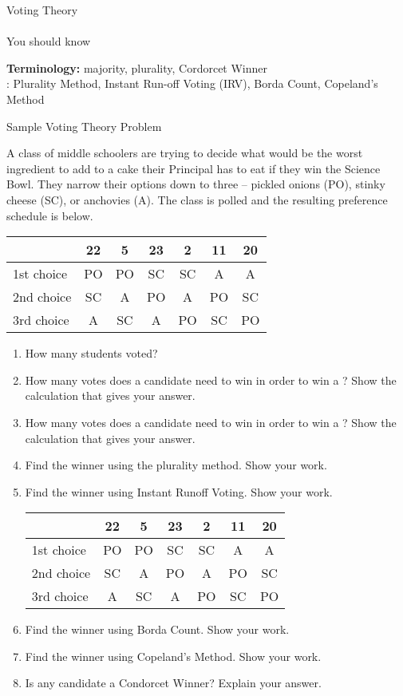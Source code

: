 \documentclass[12pt]{article}
\begin{document}
\begin{center} {\Large{Voting Theory}} \\ \quad \\You should know \end{center}

\noindent\textbf{Terminology:} majority, plurality, Cordorcet Winner\\

: Plurality Method, Instant Run-off Voting (IRV), Borda Count, Copeland's Method

\begin{center} {\Large{Sample Voting Theory Problem}}  \end{center}



A class of middle schoolers are trying to decide what would be the worst ingredient to add to a cake their Principal has to eat if they win the Science Bowl. They narrow their options down to three  -- pickled onions (PO), stinky cheese (SC), or anchovies (A). The class is polled and the resulting preference schedule is below.	\\

\begin{center}
\begin{tabular}{l || c|c|c|c|c|c}
&22&5&23&2&11&20\\
\hline \hline
1st choice& PO&PO&SC&SC&A&A\\
\hline
2nd choice&SC&A&PO&A&PO&SC\\
\hline
3rd choice&A&SC&A&PO&SC&PO
\end{tabular}
\end{center}
\begin{enumerate}
	\item How many students voted?
	\item How many votes does a candidate need to win in order to win a ? Show the calculation that gives your answer.
	\item How many votes does a candidate need to win in order to win a ? Show the calculation that gives your answer.
	\item Find the winner using the plurality method. Show your work.
	\vfill
	\item Find the winner using Instant Runoff Voting.  Show your work.
	\vfill
	\newpage
	\begin{center}
\begin{tabular}{l || c|c|c|c|c|c}
&22&5&23&2&11&20\\
\hline \hline
1st choice& PO&PO&SC&SC&A&A\\
\hline
2nd choice&SC&A&PO&A&PO&SC\\
\hline
3rd choice&A&SC&A&PO&SC&PO
\end{tabular}
\end{center}
	\item Find the winner using Borda Count.  Show your work.
	\vfill
	\item Find the winner using Copeland's Method. Show your work.
	\vfill
	\item Is any candidate a Condorcet Winner? Explain your answer.	
	\vfill
	\end{enumerate}
\newpage
\end{document}

